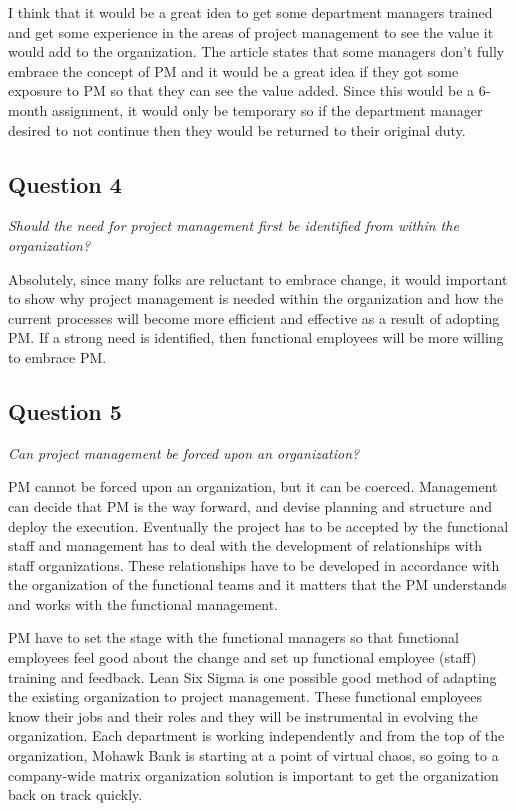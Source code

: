 \documentclass[letterpaper,10pt]{article}
\begin{document}
I think that it would be a great idea to get some department managers trained and get some experience in the areas of project management to see the value it would add to the organization.  The article states that some managers don't fully embrace the concept of PM and it would be a great idea if they got some exposure to PM so that they can see the value added.  Since this would be a 6-month assignment, it would only be temporary so if the department manager desired to not continue then they would be returned to their original duty.

\subsection{Question 4}
\emph{Should the need for project management first be identified from within the organization?}\vspace*{1em}

Absolutely, since many folks are reluctant to embrace change, it would important to show why project management is needed within the organization and how the current processes will become more efficient and effective as a result of adopting PM.  If a strong need is identified, then functional employees will be more willing to embrace PM.

\subsection{Question 5}
\emph{Can project management be forced upon an organization?}\vspace*{1em}

PM cannot be forced upon an organization, but it can be coerced.  Management can decide that PM is the way forward, and devise planning and structure and deploy the execution.  Eventually the project has to be accepted by the functional staff and management has to deal with the development of relationships with staff organizations.  These relationships have to be developed in accordance with the organization of the functional teams and it matters that the PM understands and works with the functional management.

PM have to set the stage with the functional managers so that functional employees feel good about the change and set up functional employee (staff) training and feedback.  Lean Six Sigma is one possible good method of adapting the existing organization to project management.  These functional employees know their jobs and their roles and they will be instrumental in evolving the organization.  Each department is working independently and from the top of the organization, Mohawk Bank is starting at a point of virtual chaos, so going to a company-wide matrix organization solution is important to get the organization back on track quickly.
\end{document}
